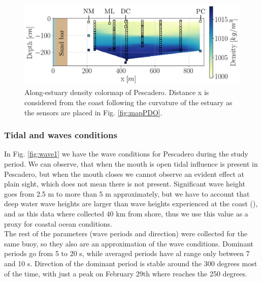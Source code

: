 \documentclass[tesis.tex]{subfiles}
\begin{document}
\begin{figure}[h!]
    \centering
    \includegraphics[scale=0.6]{Imagenes/vista_long2.png}
    \caption{Along-estuary density colormap of Pescadero. Distance x is considered from the coast following the curvature of the estuary as the sensors are placed in Fig. \ref{fig:mapPDO}. }
    \label{fig:perfiles1}
\end{figure}

\subsubsection{Tidal and waves conditions}

In Fig. \ref{fig:wave1} we have the wave conditions for Pescadero during the study period. We can observe, that when the mouth is open tidal influence is present in Pescadero, but when the mouth closes we cannot observe an evident effect at plain sight, which does not mean there is not present. Significant wave height goes from 2.5 m to more than 5 m approximately, but we have to account that deep water wave heights are larger than wave heights experienced at the coast (\cite{Williams2014}), and as this data where collected 40 km from shore, thus we use this value as a proxy for coastal ocean conditions.  \\

The rest of the parameters (wave periods and direction) were collected for the same buoy, so they also are an approximation of the wave conditions. Dominant periods go from 5 to 20 s, while averaged periods have al range only between 7 and 10 s. Direction of the dominant period is stable around the 300 degrees most of the time, with just a peak on February 29th where reaches the 250 degrees.\\
\end{document}
